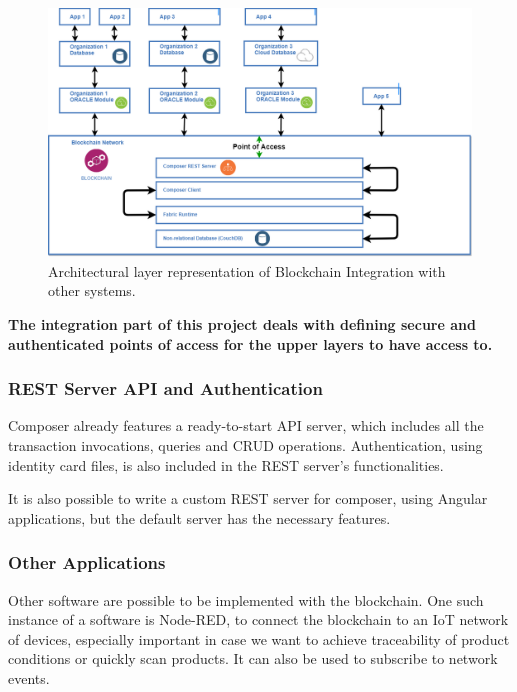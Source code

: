 \begin{figure}[h]
    \centering
    \includegraphics[scale=0.40]{media/architectural_diagram.png}
    \caption[Architectural layer representation of Blockchain Integration with other systems.]{Architectural layer representation of Blockchain Integration with other systems.}
    \label{fig:architectural_diagram}
\end{figure}

\textbf{The integration part of this project deals with defining secure and authenticated points of access for the upper layers to have access to.}

\subsubsection*{REST Server API and Authentication}
Composer already features a ready-to-start API server, which includes all the transaction invocations, queries and CRUD operations. Authentication, using identity card files, is also included in the REST server's functionalities.

It is also possible to write a custom REST server for composer, using Angular applications, but the default server has the necessary features.

\subsubsection*{Other Applications}
Other software are possible to be implemented with the blockchain. One such instance of a software is Node-RED, to connect the blockchain to an IoT network of devices, especially important in case we want to achieve traceability of product conditions or quickly scan products. It can also be used to subscribe to network events.